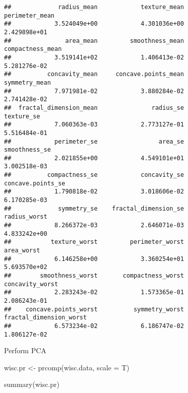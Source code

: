 \documentclass[
]{article}
\newenvironment{Shaded}{\begin{snugshade}}{\end{snugshade}}
\newcommand{\AttributeTok}[1]{\textcolor[rgb]{0.77,0.63,0.00}{#1}}
\newcommand{\FunctionTok}[1]{\textcolor[rgb]{0.00,0.00,0.00}{#1}}
\newcommand{\NormalTok}[1]{#1}
\newcommand{\OtherTok}[1]{\textcolor[rgb]{0.56,0.35,0.01}{#1}}
\begin{document}
\begin{verbatim}
##             radius_mean            texture_mean          perimeter_mean 
##            3.524049e+00            4.301036e+00            2.429898e+01 
##               area_mean         smoothness_mean        compactness_mean 
##            3.519141e+02            1.406413e-02            5.281276e-02 
##          concavity_mean     concave.points_mean           symmetry_mean 
##            7.971981e-02            3.880284e-02            2.741428e-02 
##  fractal_dimension_mean               radius_se              texture_se 
##            7.060363e-03            2.773127e-01            5.516484e-01 
##            perimeter_se                 area_se           smoothness_se 
##            2.021855e+00            4.549101e+01            3.002518e-03 
##          compactness_se            concavity_se       concave.points_se 
##            1.790818e-02            3.018606e-02            6.170285e-03 
##             symmetry_se    fractal_dimension_se            radius_worst 
##            8.266372e-03            2.646071e-03            4.833242e+00 
##           texture_worst         perimeter_worst              area_worst 
##            6.146258e+00            3.360254e+01            5.693570e+02 
##        smoothness_worst       compactness_worst         concavity_worst 
##            2.283243e-02            1.573365e-01            2.086243e-01 
##    concave.points_worst          symmetry_worst fractal_dimension_worst 
##            6.573234e-02            6.186747e-02            1.806127e-02
\end{verbatim}

Perform PCA

\begin{Shaded}
\begin{Highlighting}[]
\NormalTok{wisc.pr }\OtherTok{\textless{}{-}} \FunctionTok{prcomp}\NormalTok{(wisc.data, }\AttributeTok{scale =}\NormalTok{ T)}
\end{Highlighting}
\end{Shaded}

\begin{Shaded}
\begin{Highlighting}[]
\FunctionTok{summary}\NormalTok{(wisc.pr)}
\end{Highlighting}
\end{Shaded}
\end{document}
